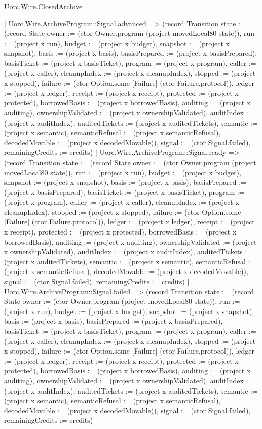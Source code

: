 \begin{lexlean}{Uorc.Wire.ClosedArchive}
\begin{semanticmodule}
{        | Uorc.Wire.ArchiveProgram::Signal.advanced => (record Transition {state := (record State {owner := (ctor Owner.program (project movedLocal80 state)), run := (project x run), budget := (project x budget), snapshot := (project x snapshot), basis := (project x basis), basisPrepared := (project x basisPrepared), basisTicket := (project x basisTicket), program := (project x program), caller := (project x caller), cleanupIndex := (project x cleanupIndex), stopped := (project x stopped), failure := (ctor Option.some [Failure] (ctor Failure.protocol)), ledger := (project x ledger), receipt := (project x receipt), protected := (project x protected), borrowedBasis := (project x borrowedBasis), auditing := (project x auditing), ownershipValidated := (project x ownershipValidated), auditIndex := (project x auditIndex), auditedTickets := (project x auditedTickets), semantic := (project x semantic), semanticRefusal := (project x semanticRefusal), decodedMovable := (project x decodedMovable)}), signal := (ctor Signal.failed), remainingCredits := credits})
        | Uorc.Wire.ArchiveProgram::Signal.ready => (record Transition {state := (record State {owner := (ctor Owner.program (project movedLocal80 state)), run := (project x run), budget := (project x budget), snapshot := (project x snapshot), basis := (project x basis), basisPrepared := (project x basisPrepared), basisTicket := (project x basisTicket), program := (project x program), caller := (project x caller), cleanupIndex := (project x cleanupIndex), stopped := (project x stopped), failure := (ctor Option.some [Failure] (ctor Failure.protocol)), ledger := (project x ledger), receipt := (project x receipt), protected := (project x protected), borrowedBasis := (project x borrowedBasis), auditing := (project x auditing), ownershipValidated := (project x ownershipValidated), auditIndex := (project x auditIndex), auditedTickets := (project x auditedTickets), semantic := (project x semantic), semanticRefusal := (project x semanticRefusal), decodedMovable := (project x decodedMovable)}), signal := (ctor Signal.failed), remainingCredits := credits})
        | Uorc.Wire.ArchiveProgram::Signal.failed => (record Transition {state := (record State {owner := (ctor Owner.program (project movedLocal80 state)), run := (project x run), budget := (project x budget), snapshot := (project x snapshot), basis := (project x basis), basisPrepared := (project x basisPrepared), basisTicket := (project x basisTicket), program := (project x program), caller := (project x caller), cleanupIndex := (project x cleanupIndex), stopped := (project x stopped), failure := (ctor Option.some [Failure] (ctor Failure.protocol)), ledger := (project x ledger), receipt := (project x receipt), protected := (project x protected), borrowedBasis := (project x borrowedBasis), auditing := (project x auditing), ownershipValidated := (project x ownershipValidated), auditIndex := (project x auditIndex), auditedTickets := (project x auditedTickets), semantic := (project x semantic), semanticRefusal := (project x semanticRefusal), decodedMovable := (project x decodedMovable)}), signal := (ctor Signal.failed), remainingCredits := credits})
}
\end{semanticmodule}
\end{lexlean}
